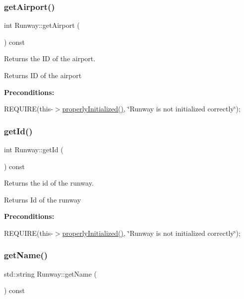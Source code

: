 \subsubsection{\texorpdfstring{get\+Airport()}{getAirport()}}
{\footnotesize\ttfamily int Runway\+::get\+Airport (\begin{DoxyParamCaption}{ }\end{DoxyParamCaption}) const}



Returns the ID of the airport. 

\begin{DoxyReturn}{Returns}
ID of the airport
\end{DoxyReturn}
{\bfseries Preconditions\+:}
\begin{DoxyItemize}
\item R\+E\+Q\+U\+I\+RE(this-\/$>$\mbox{\hyperlink{class_runway_a360d98246cabf3aa929765f81a656348}{properly\+Initialized()}}, \char`\"{}\+Runway is not initialized correctly\char`\"{}); 
\end{DoxyItemize}\mbox{\label{class_runway_afd718b92fbf2bdcbdc5c3da48a76c7af}} 
\subsubsection{\texorpdfstring{get\+Id()}{getId()}}
{\footnotesize\ttfamily int Runway\+::get\+Id (\begin{DoxyParamCaption}{ }\end{DoxyParamCaption}) const}



Returns the id of the runway. 

\begin{DoxyReturn}{Returns}
Id of the runway
\end{DoxyReturn}
{\bfseries Preconditions\+:}
\begin{DoxyItemize}
\item R\+E\+Q\+U\+I\+RE(this-\/$>$\mbox{\hyperlink{class_runway_a360d98246cabf3aa929765f81a656348}{properly\+Initialized()}}, \char`\"{}\+Runway is not initialized correctly\char`\"{}); 
\end{DoxyItemize}\mbox{\label{class_runway_a525e4c94639bde05c335492d5229f882}} 
\subsubsection{\texorpdfstring{get\+Name()}{getName()}}
{\footnotesize\ttfamily std\+::string Runway\+::get\+Name (\begin{DoxyParamCaption}{ }\end{DoxyParamCaption}) const}



